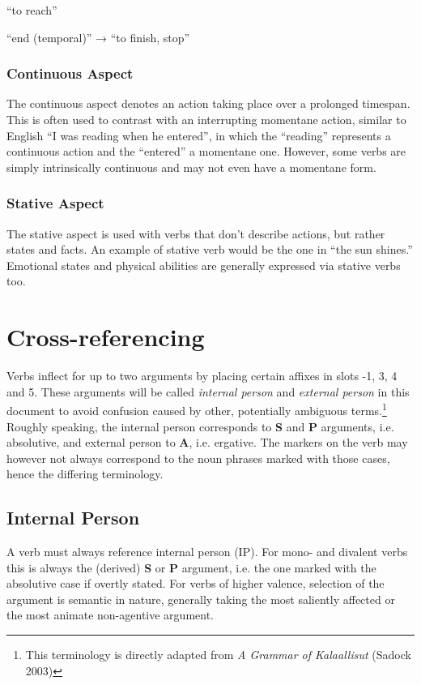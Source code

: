 \documentclass[paper=6in:9in, fontsize=10.5]{scrbook}
\makeatletter
\renewcommand\paragraph{\@startsection{paragraph}{4}{\z@}{\parskip}{-1em}{\normalfont\normalsize\bfseries}}
\newcommand{\en}[1]{``#1''}
\newcommand{\mes}[1]{\hspace{0pt}{\color{teal}#1}}
\newcommand{\rs}{ȿ}
\newcommand{\ý}{ɨ́}
\makeatother
\begin{document}
\paragraph{-per} \en{to reach}

\mes{\rs{}ád} \en{end (temporal)} → \mes{\rs{}ápper} \en{to finish, stop}


\subsubsection{Continuous Aspect}
The continuous aspect denotes an action taking place over a prolonged timespan. This is often used to contrast with an interrupting momentane action, similar to English \en{I was reading when he entered}, in which the \en{reading} represents a continuous action and the \en{entered} a momentane one. However, some verbs are simply intrinsically continuous and may not even have a momentane form.

\subsubsection{Stative Aspect}
The stative aspect is used with verbs that don't describe actions, but rather states and facts. An example of stative verb would be the one in \en{the sun shines.} Emotional states and physical abilities are generally expressed via stative verbs too.

\section{Cross-referencing} \label{sec:crossref}
Verbs inflect for up to two arguments by placing certain affixes in slots -1, 3, 4 and 5. These arguments will be called \emph{internal person} and \emph{external person} in this document to avoid confusion caused by other, potentially ambiguous terms.\footnote{This terminology is directly adapted from \emph{A Grammar of Kalaallisut} (Sadock 2003)} Roughly speaking, the internal person corresponds to \textbf{S} and \textbf{P} arguments, i.e. absolutive, and external person to \textbf{A}, i.e. ergative. The markers on the verb may however not always correspond to the noun phrases marked with those cases, hence the differing terminology.

\subsection{Internal Person}
A verb must always reference internal person (IP). For mono- and divalent verbs this is always the (derived) \textbf{S} or \textbf{P} argument, i.e. the one marked with the absolutive case if overtly stated. For verbs of higher valence, selection of the argument is semantic in nature, generally taking the most saliently affected or the most animate non-agentive argument. 
\end{document}

